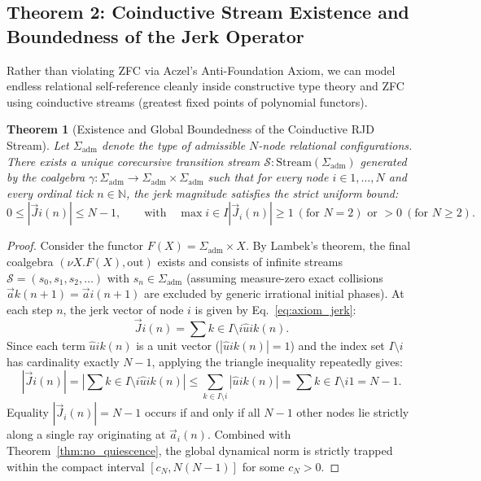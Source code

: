 \documentclass[11pt,a4paper]{article}
\theoremstyle{plain}
\newtheorem{theorem}{Theorem}[section]
\theoremstyle{definition}
\theoremstyle{remark}
\begin{document}
\subsection{Theorem 2: Coinductive Stream Existence and Boundedness of the Jerk Operator}
Rather than violating ZFC via Aczel's Anti-Foundation Axiom, we can model endless relational self-reference cleanly inside constructive type theory and ZFC using coinductive streams (greatest fixed points of polynomial functors).
\begin{theorem}[Existence and Global Boundedness of the Coinductive RJD Stream]
\label{thm:coinductive_bound}
Let $\Sigma_{\mathrm{adm}}$ denote the type of admissible $N$-node relational configurations. There exists a unique corecursive transition stream $\mathcal{S} : \mathrm{Stream}(\Sigma_{\mathrm{adm}})$ generated by the coalgebra $\gamma : \Sigma_{\mathrm{adm}} \to \Sigma_{\mathrm{adm}} \times \Sigma_{\mathrm{adm}}$ such that for every node $i \in {1,\dots,N}$ and every ordinal tick $n \in \mathbb{N}$, the jerk magnitude satisfies the strict uniform bound:
\begin{equation}
0 \le |\vec{J}i(n)| \le N - 1, \qquad \text{with} \quad \max{i \in I} |\vec{J}_i(n)| \ge 1 \ (\text{for } N=2) \text{ or } > 0 \ (\text{for } N \ge 2).
\end{equation}
\end{theorem}
\begin{proof}
Consider the functor $F(X) = \Sigma_{\mathrm{adm}} \times X$. By Lambek's theorem, the final coalgebra $(\nu X. F(X), \mathrm{out})$ exists and consists of infinite streams $\mathcal{S} = (s_0, s_1, s_2, \dots)$ with $s_n \in \Sigma_{\mathrm{adm}}$ (assuming measure-zero exact collisions $\vec{a}k(n+1) = \vec{a}i(n+1)$ are excluded by generic irrational initial phases). At each step $n$, the jerk vector of node $i$ is given by Eq.~\eqref{eq:axiom_jerk}:
\begin{equation}
\vec{J}i(n) = \sum{k \in I \setminus {i}} \hat{u}{ik}(n).
\end{equation}
Since each term $\hat{u}{ik}(n)$ is a unit vector ($|\hat{u}{ik}(n)| = 1$) and the index set $I \setminus {i}$ has cardinality exactly $N - 1$, applying the triangle inequality repeatedly gives:
\begin{equation}
|\vec{J}i(n)| = \left| \sum{k \in I \setminus {i}} \hat{u}{ik}(n) \right| \le \sum_{k \in I \setminus {i}} |\hat{u}{ik}(n)| = \sum{k \in I \setminus {i}} 1 = N - 1.
\end{equation}
Equality $|\vec{J}_i(n)| = N - 1$ occurs if and only if all $N-1$ other nodes lie strictly along a single ray originating at $\vec{a}_i(n)$. Combined with Theorem~\ref{thm:no_quiescence}, the global dynamical norm is strictly trapped within the compact interval $[c_N, N(N-1)]$ for some $c_N > 0$.
\end{proof}
\end{document}
